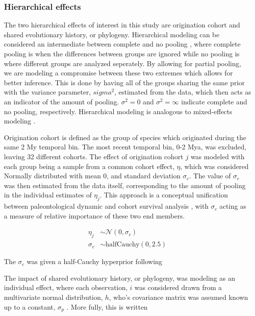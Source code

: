 \documentclass[12pt,letterpaper]{article}
\begin{document}
\subsubsection{Hierarchical effects}

The two hierarchical effects of interest in this study are origination cohort and shared evolutionary history, or phylogeny. Hierarchical modeling can be considered an intermediate between complete and no pooling \citep{Gelman2007}, where complete pooling is when the differences between groups are ignored while no pooling is where different groups are analyzed seperately. By allowing for partial pooling, we are modeling a compromise between these two extremes which allows for better inference. This is done by having all of the groups sharing the same prior with the variance parameter, \(sigma^{2}\), estimated from the data, which then acts as an indicator of the amount of pooling. \(\sigma^{2} = 0\) and \(\sigma^{2} = \infty\) indicate complete and no pooling, respectively. Hierarchical modeling is analogous to mixed-effects modeling \citep{Gelman2007}. 

Origination cohort is defined as the group of species which originated during the same 2 My temporal bin. The most recent temporal bin, 0-2 Mya, was excluded, leaving 32 different cohorts. The effect of origination cohort \(j\) was modeled with each group being a sample from a common cohort effect, \(\eta\), which was considered Normally distributed with mean 0, and standard deviation \(\sigma_{c}\). The value of \(\sigma_{c}\) was then estimated from the data itself, corresponding to the amount of pooling in the individual estimates of \(\eta_{j}\). This approach is a conceptual unification between paleontological dynamic and cohort survival analysis \citep{Foote1988,Raup1978,Raup1975,VanValen1979,Baumiller1993}, with \(\sigma_{c}\) acting as a measure of relative importance of these two end members.

\begin{align*}
  \eta_{j} &\sim \mathcal{N}(0, \sigma_{c}) \\
  \sigma_{c} &\sim \mathrm{halfCauchy}(0, 2.5)
\end{align*}

The \(\sigma_{c}\) was given a half-Cauchy hyperprior following \citet{Gelman2006a}

The impact of shared evolutionary history, or phylogeny, was modeling as an individual effect, where each observation, \(i\) was considered drawn from a multivariate normal distribution, \(h\), who's covariance matrix was assumed known up to a constant, \(\sigma_{p}\) \citep{Lynch1991,Housworth2004}. More fully, this is written
\end{document}
